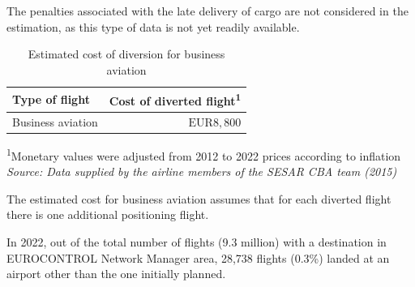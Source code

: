 \documentclass[
  11pt,
  a4paper,
]{book}
\begin{document}
\begin{tcolorbox}[enhanced jigsaw, opacityback=0, arc=.35mm, colframe=quarto-callout-note-color-frame, breakable, left=2mm, leftrule=.75mm, titlerule=0mm, colbacktitle=quarto-callout-note-color!10!white, rightrule=.15mm, opacitybacktitle=0.6, bottomtitle=1mm, colback=white, toptitle=1mm, title=\textcolor{quarto-callout-note-color}{\faInfo}\hspace{0.5em}{Note}, bottomrule=.15mm, toprule=.15mm, coltitle=black]

The penalties associated with the late delivery of cargo are not
considered in the estimation, as this type of data is not yet readily
available.

\end{tcolorbox}

\hypertarget{tbl-diversion-bus}{}
\setlength{\LTpost}{0mm}
\begin{longtable}{lr}
\caption{\label{tbl-diversion-bus}Estimated cost of diversion for business aviation }\tabularnewline

\toprule
Type of flight & Cost of diverted flight\textsuperscript{1} \\ 
\midrule
Business aviation & $\text{EUR}8,800$ \\ 
\bottomrule
\end{longtable}
\begin{minipage}{\linewidth}
\textsuperscript{1}Monetary values were adjusted from 2012 to 2022 prices according to inflation\\
\emph{Source: Data supplied by the airline members of the SESAR CBA team (2015)}\\
\end{minipage}

\begin{tcolorbox}[enhanced jigsaw, opacityback=0, arc=.35mm, colframe=quarto-callout-note-color-frame, breakable, left=2mm, leftrule=.75mm, titlerule=0mm, colbacktitle=quarto-callout-note-color!10!white, rightrule=.15mm, opacitybacktitle=0.6, bottomtitle=1mm, colback=white, toptitle=1mm, title=\textcolor{quarto-callout-note-color}{\faInfo}\hspace{0.5em}{Note}, bottomrule=.15mm, toprule=.15mm, coltitle=black]

The estimated cost for business aviation assumes that for each diverted
flight there is one additional positioning flight.

\end{tcolorbox}

In 2022, out of the total number of flights (9.3 million) with a
destination in EUROCONTROL Network Manager area, 28,738 flights (0.3\%)
landed at an airport other than the one initially planned.
\end{document}
